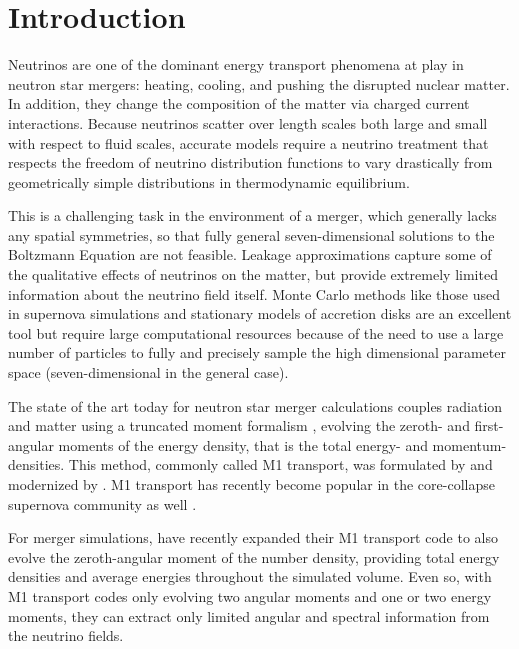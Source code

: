 \documentclass[aps,floatfix,prd,superscriptaddress,twocolumn]{revtex4-1}
\begin{document}
\maketitle

\section{Introduction}
Neutrinos are one of the dominant energy transport phenomena at play in
neutron star mergers: heating, cooling, and pushing the disrupted nuclear
matter.
In addition, they change the composition of the matter via charged current
interactions.
Because neutrinos scatter over length scales both large and small with
respect to fluid scales, accurate models require a neutrino treatment that
respects the freedom of neutrino distribution functions to vary
drastically from geometrically simple distributions in thermodynamic equilibrium.

This is a challenging task in the environment of a merger,
which generally lacks any spatial symmetries, so that fully general
seven-dimensional solutions to the Boltzmann Equation are not feasible.
Leakage approximations
\citep{ruff1996-leakage_part1,ross2003-leakage_part2,
  deat2013-leakage, gale2013-gr_rad_trans, pere2016-asl, radi2016-dynamical}
capture some of the qualitative effects of neutrinos on the matter, but
provide extremely limited information about the neutrino field itself.
Monte Carlo methods like those
used in supernova simulations \cite{abdi2012-monte_carlo}
and stationary models of accretion disks \cite{rich2015-monte_carlo}
are an excellent tool but require large computational resources
because of the need to use a large number of particles to fully and precisely
sample the high dimensional parameter space
(seven-dimensional in the general case).

The state of the art today for neutron star merger calculations
couples radiation and matter using a truncated moment formalism
\citep{fouc2015-m1_nsbh, fouc2016-m1_nsns},
evolving the zeroth- and first-angular moments of the energy density,
that is the total energy- and momentum-densities.
This method, commonly called M1 transport, was formulated by
\cite{thor1981-truncated_moment} and modernized by
\cite{shib2011-truncated_moment}.
M1 transport has recently become popular in the core-collapse supernova
community as well
\cite{kuro2012-m1_ccsne,just2015-m1_code,ocon2015-gr1d_with_nu,
  skin2016-ray_vs_m1,robe2016-gr_m1_ccsne}.

For merger simulations, \cite{fouc2016-m1_evolve_n} have recently
expanded their M1 transport code
to also evolve the zeroth-angular moment of the number density,
providing total energy densities and average energies throughout the
simulated volume.
Even so, with M1 transport codes only evolving two angular moments
and one or two energy moments,
they can extract only limited angular and spectral information
from the neutrino fields.
\end{document}
